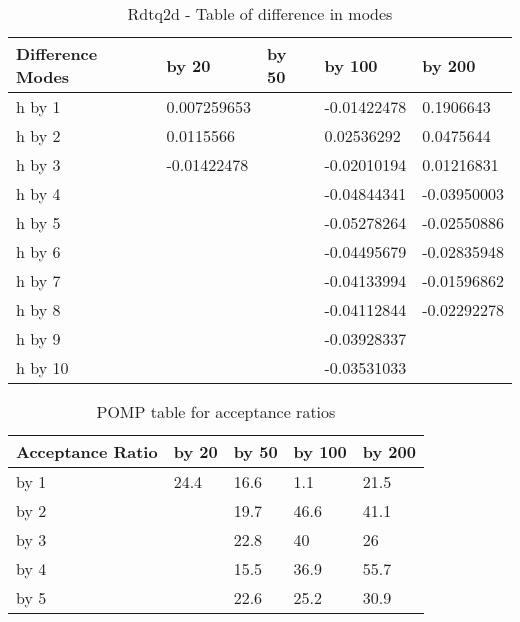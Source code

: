 \documentclass[a4paper,11pt]{article}
\begin{document}
\begin{table}[h]
\centering
\caption{Rdtq2d - Table of difference in modes}
\begin{tabular}{|l|l|l|l|l|}
\hline
Difference Modes & by 20       & by 50 & by 100      & by 200      \\ \hline
h by 1           & 0.007259653 &       & -0.01422478 & 0.1906643   \\ \hline
h by 2           & 0.0115566   &       & 0.02536292  & 0.0475644   \\ \hline
h by 3           & -0.01422478 &       & -0.02010194 & 0.01216831  \\ \hline
h by 4           &             &       & -0.04844341 & -0.03950003 \\ \hline
h by 5           &             &       & -0.05278264 & -0.02550886 \\ \hline
h by 6           &             &       & -0.04495679 & -0.02835948 \\ \hline
h by 7           &             &       & -0.04133994 & -0.01596862 \\ \hline
h by 8           &             &       & -0.04112844 & -0.02292278 \\ \hline
h by 9           &             &       & -0.03928337 &             \\ \hline
h by 10          &             &       & -0.03531033 &             \\ \hline
\end{tabular}
\end{table}


\begin{table}[h]
\centering
\caption{POMP table for acceptance ratios}
\begin{tabular}{|l|l|l|l|l|}
\hline
Acceptance Ratio & by 20 & by 50 & by 100 & by 200 \\ \hline
by 1             & 24.4  & 16.6  & 1.1    & 21.5   \\ \hline
by 2             &       & 19.7  & 46.6   & 41.1   \\ \hline
by 3             &       & 22.8  & 40     & 26     \\ \hline
by 4             &       & 15.5  & 36.9   & 55.7   \\ \hline
by 5             &       & 22.6  & 25.2   & 30.9   \\ \hline
\end{tabular}
\end{table}
\end{document}
